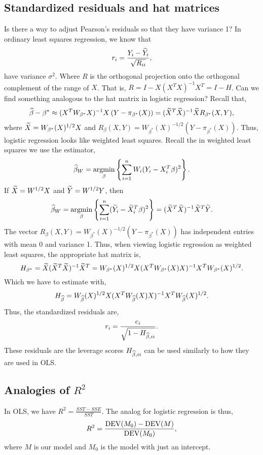 \subsection{Standardized residuals  and  hat  matrices} 
Is  there a way to  adjust  Pearson's residuals so that they have variance  1?   In  ordinary least  squares  regression, we  know that 
\[ r_i   =  \frac{Y_i-\widehat{Y}_i}{\sqrt{R_{ii}}}, \]
have  variance  $\sigma^2$.  Where  $R$  is the orthogonal  projection onto the orthogonal complement of  the  range  of $X$. That  is, $R=I-X(X^TX)^{-1}X^T=I-H$.  Can  we  find  something analogous to the hat  matrix in  logistic regression? Recall that,
\[ \widehat{\beta}-\beta^*  \approx (X^TW_{\beta^*}X)^{-1}X\left(Y-\pi_{\beta^*}(X)\right) = (\widetilde{X}^T\widetilde{X})^{-1}\widetilde{X}R_{\beta^*}(X,Y),  \]
where  $\widetilde{X}=W_{\beta^*}(X)^{1/2}X$ and $R_{\beta}(X,Y) =  W_{\beta^*}(X)^{-1/2}(Y-\pi_{\beta^*}(X))$.  Thus, logistic regression looks like weighted  least  squares. Recall the in weighted least squares  we  use  the estimator,
\[\widehat{\beta}_W = \operatorname*{argmin}_\beta \left\{\sum_{i=1}^n  W_i(Y_i-X_i^T\beta)^2\right\}. \]
If  $\widetilde{X}=W^{1/2}X$ and $\widetilde{Y}=W^{1/2}Y$, then 
\[\widehat{\beta}_W =  \operatorname*{argmin}_\beta \left\{\sum_{i=1}^n  (\widetilde{Y}_i-\widetilde{X}_i^T\beta)^2\right\} = (\widetilde{X}^T\widetilde{X})^{-1}\widetilde{X}^T\widetilde{Y}. \]
The  vector  $R_{\beta}(X,Y) =  W_{\beta^*}(X)^{-1/2}(Y-\pi_{\beta^*}(X))$ has independent entries with  mean 0  and variance 1. Thus, when  viewing  logistic regression as  weighted  least squares, the appropriate  hat  matrix is,
\[H_{\beta^*} = \widetilde{X}(\widetilde{X}^T\widetilde{X})^{-1}\widetilde{X}^T = W_{\beta^*}(X)^{1/2}X(X^TW_{\beta^*}(X)X)^{-1}X^TW_{\beta^*}(X)^{1/2}.\]
Which  we  have to  estimate  with,
\[H_{\widehat{\beta}} =  W_{\widehat{\beta}}(X)^{1/2}X(X^TW_{\widehat{\beta}}(X)X)^{-1}X^TW_{\widehat{\beta}}(X)^{1/2}. \]
Thus,  the standardized residuals are,
\[r_i = \frac{e_i}{\sqrt{1-H_{\widehat{\beta},ii}}}. \]
These residuals  are the  leverage scores $H_{\widehat{\beta},ii}$ can be used similarly to how they are used in OLS.
\subsection{Analogies  of  $R^2$}
In OLS,  we have  $R^2  =  \frac{SST-SSE}{SST}$. The analog  for logistic regression  is  thus,
\[ R^2  = \frac{\operatorname{DEV}(M_0)-\operatorname{DEV}(M)}{\operatorname{DEV}(M_0)}, \]
where  $M$  is our  model  and $M_0$ is the  model with  just  an  intercept. 
